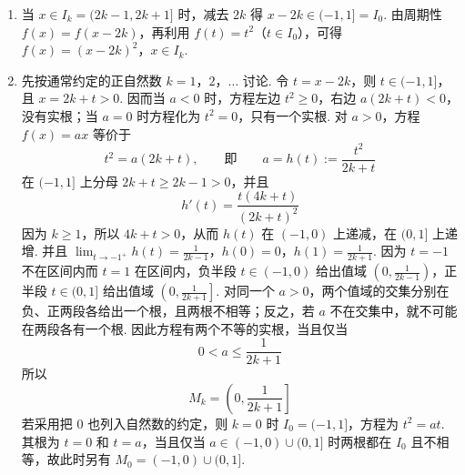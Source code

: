 \documentclass[UTF8,a4paper,oneside,11pt]{ctexbook}
\begin{document}
\begin{solution}
\begin{enumerate}
\item 当 \(x\in I_k=(2k-1,2k+1]\) 时，减去 \(2k\) 得 \(x-2k\in(-1,1]=I_0\). 由周期性 \(f(x)=f(x-2k)\)，再利用 \(f(t)=t^2\)（\(t\in I_0\)），可得
\(f(x)=(x-2k)^2\)，\(x\in I_k\).

\item 先按通常约定的正自然数 \(k=1\)，\(2\)，\(\ldots\) 讨论. 令 \(t=x-2k\)，则 \(t\in(-1,1]\)，且 \(x=2k+t>0\). 因而当 \(a<0\) 时，方程左边 \(t^2\geqslant0\)，右边 \(a(2k+t)<0\)，没有实根；当 \(a=0\) 时方程化为 \(t^2=0\)，只有一个实根. 对 \(a>0\)，方程 \(f(x)=ax\) 等价于
\[
t^2=a(2k+t),\qquad\text{即}\qquad a=h(t):=\frac{t^2}{2k+t}
\]
在 \((-1,1]\) 上分母 \(2k+t\geqslant2k-1>0\)，并且
\[
h'(t)=\frac{t(4k+t)}{(2k+t)^2}
\]
因为 \(k\geqslant1\)，所以 \(4k+t>0\)，从而 \(h(t)\) 在 \((-1,0)\) 上递减，在 \((0,1]\) 上递增. 并且
\(\lim_{t\to-1^+}h(t)=\frac{1}{2k-1}\)，\(h(0)=0\)，\(h(1)=\frac{1}{2k+1}\).
因为 \(t=-1\) 不在区间内而 \(t=1\) 在区间内，负半段 \(t\in(-1,0)\) 给出值域 \(\left(0,\frac{1}{2k-1}\right)\)，正半段 \(t\in(0,1]\) 给出值域 \(\left(0,\frac{1}{2k+1}\right]\). 对同一个 \(a>0\)，两个值域的交集分别在负、正两段各给出一个根，且两根不相等；反之，若 \(a\) 不在交集中，就不可能在两段各有一个根. 因此方程有两个不等的实根，当且仅当
\[
0<a\leqslant\frac{1}{2k+1}
\]
所以
\[
M_k=\left(0,\frac{1}{2k+1}\right]
\]
若采用把 \(0\) 也列入自然数的约定，则 \(k=0\) 时 \(I_0=(-1,1]\)，方程为 \(t^2=at\). 其根为 \(t=0\) 和 \(t=a\)，当且仅当 \(a\in(-1,0)\cup(0,1]\) 时两根都在 \(I_0\) 且不相等，故此时另有 \(M_0=(-1,0)\cup(0,1]\).
\end{enumerate}
\end{solution}

\end{document}
